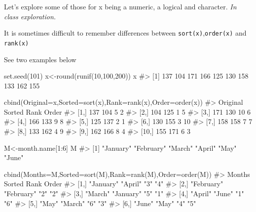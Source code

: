 \documentclass[
  letterpaper,
  DIV=11,
  numbers=noendperiod]{scrreprt}
\newenvironment{Shaded}{\begin{snugshade}}{\end{snugshade}}
\newcommand{\AttributeTok}[1]{\textcolor[rgb]{0.40,0.45,0.13}{#1}}
\newcommand{\CommentTok}[1]{\textcolor[rgb]{0.37,0.37,0.37}{#1}}
\newcommand{\DecValTok}[1]{\textcolor[rgb]{0.68,0.00,0.00}{#1}}
\newcommand{\FunctionTok}[1]{\textcolor[rgb]{0.28,0.35,0.67}{#1}}
\newcommand{\NormalTok}[1]{\textcolor[rgb]{0.00,0.23,0.31}{#1}}
\newcommand{\OtherTok}[1]{\textcolor[rgb]{0.00,0.23,0.31}{#1}}
\newcommand{\SpecialCharTok}[1]{\textcolor[rgb]{0.37,0.37,0.37}{#1}}
\begin{document}
Let's explore some of those for x being a numeric, a logical and
character. \emph{In class exploration.}

It is sometimes difficult to remember differences between
\texttt{sort(x)},\texttt{order(x)} and \texttt{rank(x)}

See two examples below

\begin{Shaded}
\begin{Highlighting}[]
\FunctionTok{set.seed}\NormalTok{(}\DecValTok{101}\NormalTok{)}
\NormalTok{x}\OtherTok{\textless{}{-}}\FunctionTok{round}\NormalTok{(}\FunctionTok{runif}\NormalTok{(}\DecValTok{10}\NormalTok{,}\DecValTok{100}\NormalTok{,}\DecValTok{200}\NormalTok{))}
\NormalTok{x}
\CommentTok{\#\textgreater{}  [1] 137 104 171 166 125 130 158 133 162 155}

\FunctionTok{cbind}\NormalTok{(}\AttributeTok{Original=}\NormalTok{x,}\AttributeTok{Sorted=}\FunctionTok{sort}\NormalTok{(x),}\AttributeTok{Rank=}\FunctionTok{rank}\NormalTok{(x),}\AttributeTok{Order=}\FunctionTok{order}\NormalTok{(x))}
\CommentTok{\#\textgreater{}       Original Sorted Rank Order}
\CommentTok{\#\textgreater{}  [1,]      137    104    5     2}
\CommentTok{\#\textgreater{}  [2,]      104    125    1     5}
\CommentTok{\#\textgreater{}  [3,]      171    130   10     6}
\CommentTok{\#\textgreater{}  [4,]      166    133    9     8}
\CommentTok{\#\textgreater{}  [5,]      125    137    2     1}
\CommentTok{\#\textgreater{}  [6,]      130    155    3    10}
\CommentTok{\#\textgreater{}  [7,]      158    158    7     7}
\CommentTok{\#\textgreater{}  [8,]      133    162    4     9}
\CommentTok{\#\textgreater{}  [9,]      162    166    8     4}
\CommentTok{\#\textgreater{} [10,]      155    171    6     3}
\end{Highlighting}
\end{Shaded}

\begin{Shaded}
\begin{Highlighting}[]
\NormalTok{M}\OtherTok{\textless{}{-}}\NormalTok{month.name[}\DecValTok{1}\SpecialCharTok{:}\DecValTok{6}\NormalTok{]}
\NormalTok{M}
\CommentTok{\#\textgreater{} [1] "January"  "February" "March"    "April"    "May"      "June"}

\FunctionTok{cbind}\NormalTok{(}\AttributeTok{Months=}\NormalTok{M,}\AttributeTok{Sorted=}\FunctionTok{sort}\NormalTok{(M),}\AttributeTok{Rank=}\FunctionTok{rank}\NormalTok{(M),}\AttributeTok{Order=}\FunctionTok{order}\NormalTok{(M))}
\CommentTok{\#\textgreater{}      Months     Sorted     Rank Order}
\CommentTok{\#\textgreater{} [1,] "January"  "April"    "3"  "4"  }
\CommentTok{\#\textgreater{} [2,] "February" "February" "2"  "2"  }
\CommentTok{\#\textgreater{} [3,] "March"    "January"  "5"  "1"  }
\CommentTok{\#\textgreater{} [4,] "April"    "June"     "1"  "6"  }
\CommentTok{\#\textgreater{} [5,] "May"      "March"    "6"  "3"  }
\CommentTok{\#\textgreater{} [6,] "June"     "May"      "4"  "5"}
\end{Highlighting}
\end{Shaded}
\end{document}
